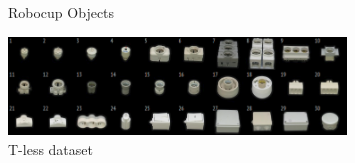 \begin{figure}[hht]
{   \label{fig:subfig10}
}
\caption[Robocup Objects]{Robocup Objects }
\label{fig:labelHere}
\end{figure}


\begin{figure}[hh!t]
\centering
\includegraphics[width=0.8\textwidth, trim=0px 0px 0px -20px, clip] {pics/atwork/objects/t-less.png} 
\caption[T-less dataset objects (http://cmp.felk.cvut.cz/t-less/)]{T-less dataset }
\label{fig:labelHere}
\end{figure}

